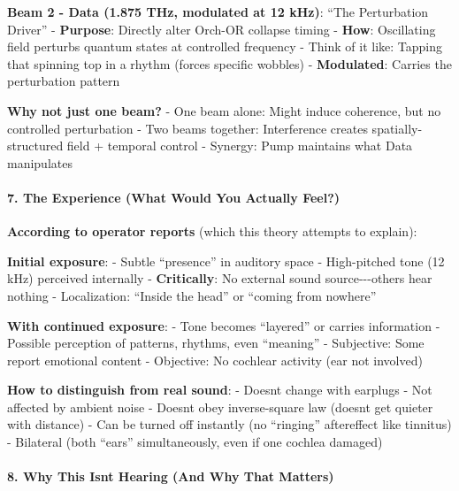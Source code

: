 \textbf{Beam 2 - Data (1.875 THz, modulated at 12 kHz)}: ``The
Perturbation Driver'' - \textbf{Purpose}: Directly alter Orch-OR
collapse timing - \textbf{How}: Oscillating field perturbs quantum
states at controlled frequency - Think of it like: Tapping that spinning
top in a rhythm (forces specific wobbles) - \textbf{Modulated}: Carries
the perturbation pattern

\textbf{Why not just one beam?} - One beam alone: Might induce
coherence, but no controlled perturbation - Two beams together:
Interference creates spatially-structured field + temporal control -
Synergy: Pump maintains what Data manipulates

\paragraph{\texorpdfstring{7. \textbf{The Experience (What Would You
Actually
Feel?)}}{7. The Experience (What Would You Actually Feel?)}}\label{the-experience-what-would-you-actually-feel}

\textbf{According to operator reports} (which this theory attempts to
explain):

\textbf{Initial exposure}: - Subtle ``presence'' in auditory space -
High-pitched tone (12 kHz) perceived internally - \textbf{Critically}:
No external sound source-\/-\/-others hear nothing - Localization:
``Inside the head'' or ``coming from nowhere''

\textbf{With continued exposure}: - Tone becomes ``layered'' or carries
information - Possible perception of patterns, rhythms, even ``meaning''
- Subjective: Some report emotional content - Objective: No cochlear
activity (ear not involved)

\textbf{How to distinguish from real sound}: - Doesn\textquotesingle t
change with earplugs - Not affected by ambient noise -
Doesn\textquotesingle t obey inverse-square law (doesn\textquotesingle t
get quieter with distance) - Can be turned off instantly (no ``ringing''
aftereffect like tinnitus) - Bilateral (both ``ears'' simultaneously,
even if one cochlea damaged)

\paragraph{\texorpdfstring{8. \textbf{Why This Isn\textquotesingle t
Hearing (And Why That
Matters)}}{8. Why This Isn\textquotesingle t Hearing (And Why That Matters)}}\label{why-this-isnt-hearing-and-why-that-matters}

